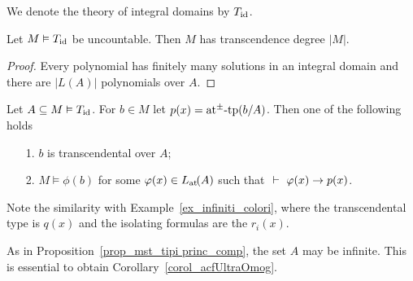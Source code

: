 \documentclass[creche.tex]{subfiles}
\begin{document}
We denote the theory  of integral domains by \emph{$T_{\rm id}$}.


\begin{proposition}
Let $M\models T_{\rm id}$ be uncountable. Then $M$ has transcendence degree $|M|$.
\end{proposition}

\begin{proof}
Every polynomial has finitely many solutions in an integral domain and there are $|L(A)|$ polynomials over $A$.
\end{proof}



\begin{proposition}\label{prop_di_tipi princ_comp}
Let $A\subseteq M\models T_{\rm id}$. For $b\in M$ let $p(x)=\atpmtp(b/A)$. Then one of the following holds  
\begin{itemize}
\item[1.] $b$ is transcendental over $A$;
\item[2.] $M\models\phi(b)$ for some $\phi(x)\in\atL(A)$ such that
$\ \proves\ \phi(x)\imp p(x)$.
\end{itemize}\end{proposition}

Note the similarity with Example~\ref{ex_infiniti_colori}, where the transcendental type is $q(x)$ and the isolating formulas are the $r_i(x)$. 

As in Proposition~\ref{prop_mst_tipi princ_comp}, the set $A$ may be infinite. This is essential to obtain Corollary~\ref{corol_acfUltraOmog}.
\end{document}
